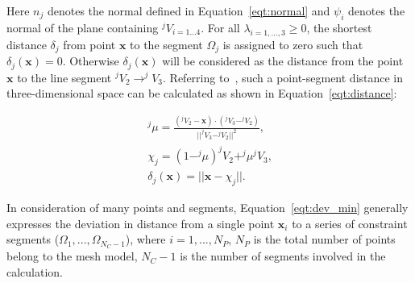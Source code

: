 Here $n_j$ denotes the normal defined in Equation~\ref{eqt:normal} and $\psi_i$ denotes the normal of the plane containing $^jV_{i=1...4}$.
For all $\lambda_{i=1,...,3} \ge 0$, the shortest distance $\delta_j$ from point $\textbf{x}$ to the segment $\Omega_j$ is assigned to zero such that $\delta_j(\textbf{x})=0$.
Otherwise $\delta_j(\textbf{x})$ will be considered as the distance from the point $\textbf{x}$ to the line segment $^jV_2 \rightarrow ^jV_3$.
Referring to~\cite{weisstein}, such a point-segment distance in three-dimensional space can be calculated as shown in Equation~\ref{eqt:distance}:

\begin{equation}
\begin{aligned}
^j\mu = \frac{(^jV_2-\textbf{x})\cdot(^jV_3-^jV_2)}{||^jV_3-^jV_2||^2} \mbox{,} \\
\chi_j = (1-^j\mu)^jV_2 + ^j\mu^jV_3 \mbox{,} \\
\delta_{j}(\textbf{x}) = ||\textbf{x}-\chi_j|| \mbox{.}
\end{aligned}
\label{eqt:distance}
\end{equation}

In consideration of many points and segments, Equation~\ref{eqt:dev_min} generally expresses the deviation in distance from a single point $\textbf{x}_i$ to a series of constraint segments ($\Omega_{1},...,\Omega_{N_C-1}$), where $i=1,...,N_P$, $N_P$ is the total number of points belong to the mesh model, $N_C-1$ is the number of segments involved in the calculation.




